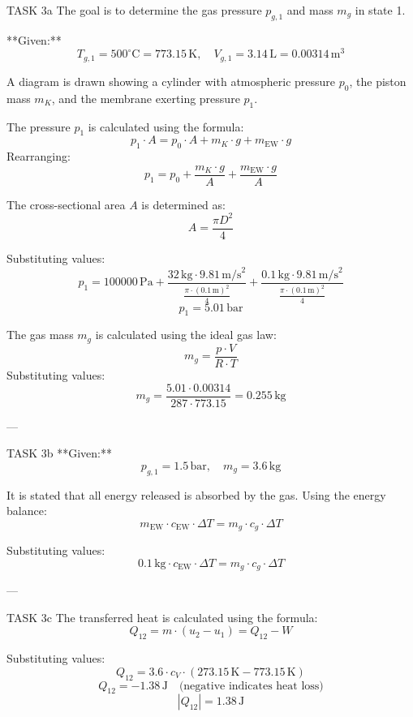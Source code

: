 TASK 3a  
The goal is to determine the gas pressure \( p_{g,1} \) and mass \( m_g \) in state 1.  

**Given:**  
\[
T_{g,1} = 500^\circ\text{C} = 773.15 \, \text{K}, \quad V_{g,1} = 3.14 \, \text{L} = 0.00314 \, \text{m}^3
\]  

A diagram is drawn showing a cylinder with atmospheric pressure \( p_0 \), the piston mass \( m_K \), and the membrane exerting pressure \( p_1 \).  

The pressure \( p_1 \) is calculated using the formula:  
\[
p_1 \cdot A = p_0 \cdot A + m_K \cdot g + m_{\text{EW}} \cdot g
\]  
Rearranging:  
\[
p_1 = p_0 + \frac{m_K \cdot g}{A} + \frac{m_{\text{EW}} \cdot g}{A}
\]  

The cross-sectional area \( A \) is determined as:  
\[
A = \frac{\pi D^2}{4}
\]  

Substituting values:  
\[
p_1 = 100000 \, \text{Pa} + \frac{32 \, \text{kg} \cdot 9.81 \, \text{m/s}^2}{\frac{\pi \cdot (0.1 \, \text{m})^2}{4}} + \frac{0.1 \, \text{kg} \cdot 9.81 \, \text{m/s}^2}{\frac{\pi \cdot (0.1 \, \text{m})^2}{4}}
\]  
\[
p_1 = 5.01 \, \text{bar}
\]  

The gas mass \( m_g \) is calculated using the ideal gas law:  
\[
m_g = \frac{p \cdot V}{R \cdot T}
\]  
Substituting values:  
\[
m_g = \frac{5.01 \cdot 0.00314}{287 \cdot 773.15} = 0.255 \, \text{kg}
\]  

---

TASK 3b  
**Given:**  
\[
p_{g,1} = 1.5 \, \text{bar}, \quad m_g = 3.6 \, \text{kg}
\]  

It is stated that all energy released is absorbed by the gas. Using the energy balance:  
\[
m_{\text{EW}} \cdot c_{\text{EW}} \cdot \Delta T = m_g \cdot c_{g} \cdot \Delta T
\]  

Substituting values:  
\[
0.1 \, \text{kg} \cdot c_{\text{EW}} \cdot \Delta T = m_g \cdot c_{g} \cdot \Delta T
\]  

---

TASK 3c  
The transferred heat is calculated using the formula:  
\[
Q_{12} = m \cdot (u_2 - u_1) = Q_{12} - W
\]  

Substituting values:  
\[
Q_{12} = 3.6 \cdot c_V \cdot (273.15 \, \text{K} - 773.15 \, \text{K})
\]  
\[
Q_{12} = -1.38 \, \text{J} \quad \text{(negative indicates heat loss)}
\]  
\[
|Q_{12}| = 1.38 \, \text{J}
\]  